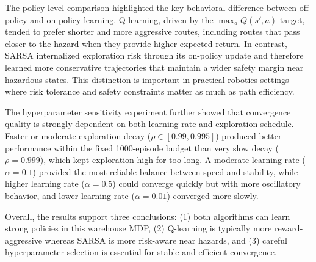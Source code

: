 \documentclass[10pt,twocolumn]{article}
\begin{document}
The policy-level comparison highlighted the key behavioral difference between off-policy and on-policy learning. Q-learning, driven by the $\max_a Q(s',a)$ target, tended to prefer shorter and more aggressive routes, including routes that pass closer to the hazard when they provide higher expected return. In contrast, SARSA internalized exploration risk through its on-policy update and therefore learned more conservative trajectories that maintain a wider safety margin near hazardous states. This distinction is important in practical robotics settings where risk tolerance and safety constraints matter as much as path efficiency.

The hyperparameter sensitivity experiment further showed that convergence quality is strongly dependent on both learning rate and exploration schedule. Faster or moderate exploration decay ($\rho \in [0.99, 0.995]$) produced better performance within the fixed 1000-episode budget than very slow decay ($\rho=0.999$), which kept exploration high for too long. A moderate learning rate ($\alpha=0.1$) provided the most reliable balance between speed and stability, while higher learning rate ($\alpha=0.5$) could converge quickly but with more oscillatory behavior, and lower learning rate ($\alpha=0.01$) converged more slowly.

Overall, the results support three conclusions: (1) both algorithms can learn strong policies in this warehouse MDP, (2) Q-learning is typically more reward-aggressive whereas SARSA is more risk-aware near hazards, and (3) careful hyperparameter selection is essential for stable and efficient convergence.


\nocite{*}




\end{document}

